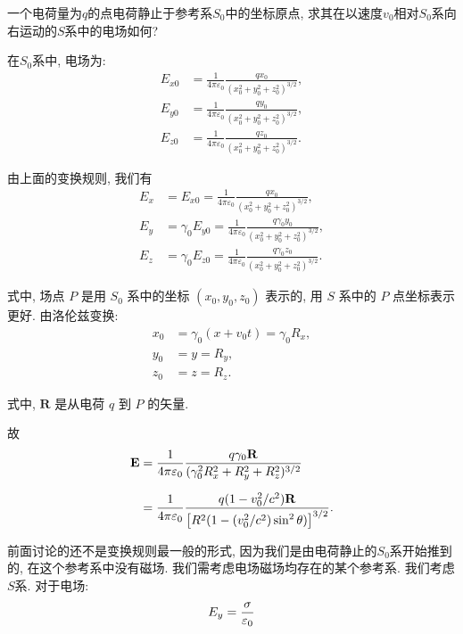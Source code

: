\begin{example}
  一个电荷量为$q$的点电荷静止于参考系$S_0$中的坐标原点, 求其在以速度$v_0$相对$S_0$系向右运动的$S$系中的电场如何?


在$S_0$系中, 电场为:
\begin{align*}
E_{x0} &= \frac{1}{4\pi\varepsilon_0} \frac{q x_0}{(x_0^2 + y_0^2 + z_0^2)^{3/2}}, \\[6pt]
E_{y0} &= \frac{1}{4\pi\varepsilon_0} \frac{q y_0}{(x_0^2 + y_0^2 + z_0^2)^{3/2}}, \\[6pt]
E_{z0} &= \frac{1}{4\pi\varepsilon_0} \frac{q z_0}{(x_0^2 + y_0^2 + z_0^2)^{3/2}}.
\end{align*}

由上面的变换规则, 我们有
\begin{align*}
E_x &= E_{x0} = \frac{1}{4\pi\varepsilon_0} \frac{q x_0}{(x_0^2 + y_0^2 + z_0^2)^{3/2}}, \\[6pt]
E_y &= \gamma_0 E_{y0} = \frac{1}{4\pi\varepsilon_0} \frac{q \gamma_0 y_0}{(x_0^2 + y_0^2 + z_0^2)^{3/2}}, \\[6pt]
E_z &= \gamma_0 E_{z0} = \frac{1}{4\pi\varepsilon_0} \frac{q \gamma_0 z_0}{(x_0^2 + y_0^2 + z_0^2)^{3/2}}.
\end{align*}

式中, 场点 \( P \) 是用 \( S_0 \) 系中的坐标 \((x_0, y_0, z_0)\) 表示的,
用 \( S \) 系中的 \( P \) 点坐标表示更好.
由洛伦兹变换:
\begin{align*}
x_0 &= \gamma_0 (x + v_0 t) = \gamma_0 R_x, \\[4pt]
y_0 &= y = R_y, \\[4pt]
z_0 &= z = R_z.
\end{align*}

式中, \( \mathbf R \) 是从电荷 \( q \) 到 \( P \) 的矢量.

故
\begin{align*}
\mathbf{E} &= \frac{1}{4\pi\varepsilon_0}
     \frac{q \gamma_0 \mathbf R}
          {(\gamma_0^2 R_x^2 + R_y^2 + R_z^2)^{3/2}} \\[6pt]
  &= \frac{1}{4\pi\varepsilon_0}
     \frac{q (1 - v_0^2/c^2) \mathbf R}
          {\bigl[R^2 (1 - (v_0^2/c^2)\sin^2\theta)\bigr]^{3/2}}.
\end{align*}

\end{example}

前面讨论的还不是变换规则最一般的形式, 因为我们是由电荷静止的$S_0$系开始推到的, 在这个参考系中没有磁场. 我们需考虑电场磁场均存在的某个参考系. 我们考虑$S$系. 对于电场:
\[
E_y = \frac{\sigma}{\mathop{}\!\varepsilon_0}
\]

